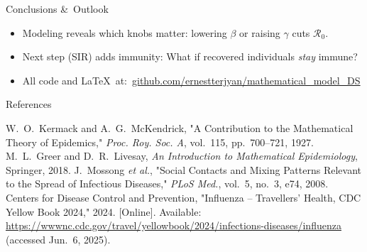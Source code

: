 \documentclass[14pt,aspectratio=169]{beamer}
\newcommand{\RR}{\mathcal{R}_0}
\begin{document}
\begin{frame}{Conclusions \& Outlook}
  \begin{itemize}
    \item Modeling reveals which knobs matter: lowering $\beta$ or raising $\gamma$ cuts $\RR$.
    \item Next step (SIR) adds immunity: What if recovered individuals \emph{stay} immune?
    \item All code and \LaTeX\ at:\  \href{https://github.com/ernestterjyan/mathematical_model_DS}{github.com/ernestterjyan/mathematical\_model\_DS}
  \end{itemize}
  \vfill
\end{frame}

\begin{frame}[allowframebreaks]{References}
  \begin{thebibliography}{9}
     W.~O.~Kermack and A.~G.~McKendrick,
      "A Contribution to the Mathematical Theory of Epidemics," 
      \textit{Proc. Roy. Soc. A}, vol.~115, pp.~700--721, 1927.
     M.~L.~Greer and D.~R.~Livesay,
      \textit{An Introduction to Mathematical Epidemiology}, Springer, 2018.
     J.~Mossong \textit{et al.},
      "Social Contacts and Mixing Patterns Relevant to the Spread of Infectious Diseases," 
      \textit{PLoS Med.}, vol.~5, no.~3, e74, 2008.
     Centers for Disease Control and Prevention,
      "Influenza – Travellers’ Health, CDC Yellow Book 2024," 2024.
      [Online]. Available: \url{https://wwwnc.cdc.gov/travel/yellowbook/2024/infections-diseases/influenza}
      (accessed Jun.~6, 2025).
  \end{thebibliography}
\end{frame}
\end{document}
